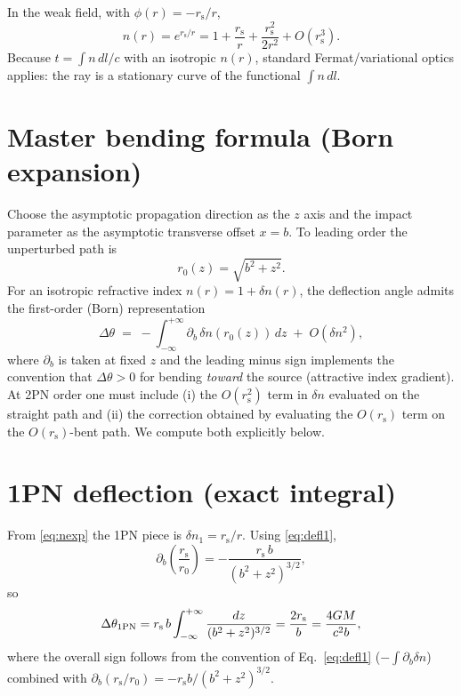 \documentclass[11pt]{article}
\newcommand{\rs}{r_{\mathrm{s}}}
\begin{document}
In the weak field, with $\phi(r)=-\rs/r$,
\begin{equation}
n(r)=e^{\rs/r}=1+\frac{\rs}{r}+\frac{\rs^2}{2r^2}+O(\rs^3).
\label{eq:nexp}
\end{equation}
Because $t=\int n\,dl/c$ with an isotropic $n(r)$, standard Fermat/variational optics applies: the ray is a stationary curve of the functional $\int n\,dl$.

\section{Master bending formula (Born expansion)}\label{sec:master}
Choose the asymptotic propagation direction as the $z$ axis and the impact parameter as the asymptotic transverse offset $x=b$. To leading order the unperturbed path is
\begin{equation}
r_0(z)=\sqrt{b^2+z^2}.
\label{eq:r0_app5}
\end{equation}
For an isotropic refractive index $n(r)=1+\delta n(r)$, the deflection angle admits the first-order (Born) representation
\begin{equation}
\Delta\theta \;=\; -\int_{-\infty}^{+\infty}\partial_b\,\delta n\!\left(r_0(z)\right)\,dz \;+\; O(\delta n^2),
\label{eq:defl1}
\end{equation}
where $\partial_b$ is taken at fixed $z$ and the leading minus sign implements the convention that $\Delta\theta>0$ for bending \emph{toward} the source (attractive index gradient). At 2PN order one must include (i) the $O(\rs^2)$ term in $\delta n$ evaluated on the straight path and (ii) the correction obtained by evaluating the $O(\rs)$ term on the $O(\rs)$-bent path. We compute both explicitly below.

\section{1PN deflection (exact integral)}\label{sec:1pn}
From \eqref{eq:nexp} the 1PN piece is $\delta n_1=\rs/r$. Using \eqref{eq:defl1},
\begin{equation}
\partial_b\left(\frac{\rs}{r_0}\right)=-\frac{\rs\,b}{(b^2+z^2)^{3/2}},
\end{equation}
so
\begin{equation}
\Delta\theta_{1{\rm PN}}
= \rs\,b\int_{-\infty}^{+\infty}\frac{dz}{(b^2+z^2)^{3/2}}
= \frac{2\rs}{b}
=\frac{4GM}{c^2 b},
\label{eq:theta1}
\end{equation}
where the overall sign follows from the convention of
Eq.~\eqref{eq:defl1} ($-\int\partial_b\delta n$) combined with
$\partial_b(\rs/r_0)=-\rs b/(b^2+z^2)^{3/2}$.
\end{document}
